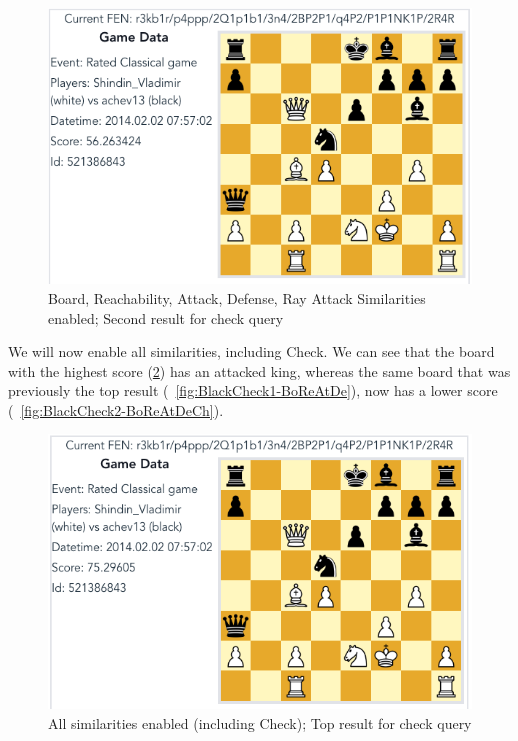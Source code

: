 \documentclass[11pt]{article}
\begin{document}
    \begin{figure}[H]
        \centering
        \includegraphics[width=12cm]{images/BlackCheck2-BoReAtDe}
        \caption{Board, Reachability, Attack, Defense, Ray Attack Similarities enabled; Second result for check query}
        \label{fig:BlackCheck2-BoReAtDe}
    \end{figure}

    We will now enable all similarities, including Check. We can see that the board with the highest score (\ref{fig:BlackCheck1-BoReAtDeCh}) has an attacked king, whereas the same board that was previously the top result (~\ref{fig:BlackCheck1-BoReAtDe}), now has a lower score (~\ref{fig:BlackCheck2-BoReAtDeCh}).

    \begin{figure}[H]
        \centering
        \includegraphics[width=12cm]{images/BlackCheck1-BoReAtDeCh}
        \caption{All similarities enabled (including Check); Top result for check query}
        \label{fig:BlackCheck1-BoReAtDeCh}
    \end{figure}
\end{document}
